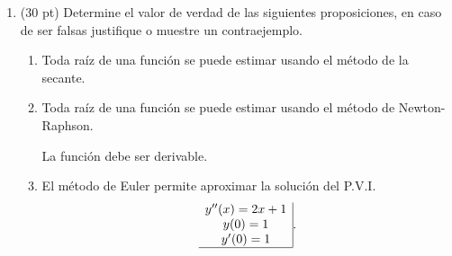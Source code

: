 \documentclass[11pt]{article}
\begin{document}
\begin{enumerate}
\item (30 pt) Determine el valor de verdad de las siguientes proposiciones, en caso de ser falsas justifique o muestre un contraejemplo.
\begin{enumerate}
\item
{} 
    \begin{minipage}{0.4\textwidth}
	Toda ra\'iz de una funci\'on se puede estimar usando el m\'etodo de la secante.
    \end{minipage} 
    \begin{minipage}{0.4\textwidth}
    \end{minipage}
%
\item
{} 
    \begin{minipage}{0.4\textwidth}
	Toda ra\'iz de una funci\'on se puede estimar usando el m\'etodo de Newton-Raphson.
    \end{minipage} 
    \begin{minipage}{0.4\textwidth}
    La funci\'on debe ser derivable.
    
    \end{minipage}
%
\item
{} 
    \begin{minipage}{0.4\textwidth}
	El método de Euler permite aproximar la soluci\'on del P.V.I. 
    $$
    \begin{array}{c|}
    y''(x)=2x+1\\
    y(0)=1\\
    y'(0)=1\\ \hline
    \end{array}.
    $$
    \end{minipage} 
    \begin{minipage}{0.4\textwidth}
    


\end{minipage}
\end{enumerate}
\end{enumerate}
\end{document}
